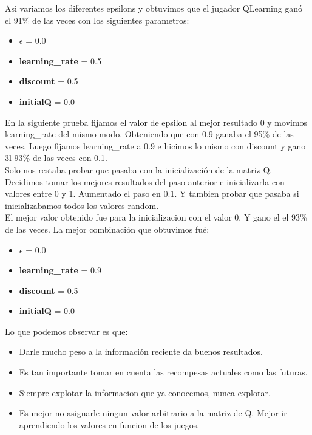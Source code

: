 

Asi variamos los diferentes epsilons y obtuvimos que el jugador QLearning ganó el 91\% de las veces con los siguientes parametros: \\

\begin{itemize}
  \item  \textbf{$\epsilon$} = 0.0
  \item \textbf{learning\_rate} = 0.5
  \item \textbf{discount} = 0.5
  \item \textbf{initialQ} = 0.0
\end{itemize}



En la siguiente prueba fijamos el valor de epsilon al mejor resultado 0 y movimos learning\_rate del mismo modo. Obteniendo que con 0.9 ganaba el 95\% de las veces. Luego fijamos learning\_rate a 0.9 e hicimos lo mismo con discount y gano 3l 93\% de las veces con 0.1. \\

Solo nos restaba probar que pasaba con la inicialización de la matriz Q. Decidimos tomar los mejores resultados del paso anterior e inicializarla con valores entre 0 y 1. Aumentado el paso en 0.1. Y tambien probar que pasaba si inicializabamos todos los valores random. \\
 
El mejor valor obtenido fue para la inicializacion con el valor 0. Y gano el  el 93\% de las veces. La mejor combinación que obtuvimos fué:

\begin{itemize}
  \item  \textbf{$\epsilon$} = 0.0
  \item \textbf{learning\_rate} = 0.9
  \item \textbf{discount} = 0.5
  \item \textbf{initialQ} = 0.0
\end{itemize}



Lo que podemos observar es que: 
\begin{itemize}
  \item  Darle mucho peso a la información reciente da buenos resultados. 
  \item  Es tan importante tomar en cuenta las recompesas actuales como las futuras. 
  \item  Siempre explotar la informacion que ya conocemos, nunca explorar. 
  \item  Es mejor no asignarle ningun valor arbitrario a la matriz de Q. Mejor ir aprendiendo los valores en funcion de los juegos. 

\end{itemize}


